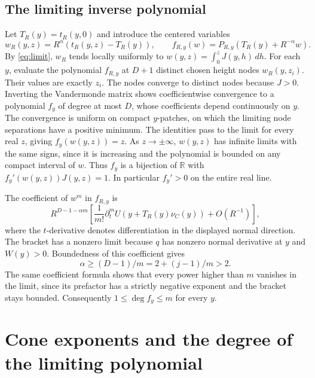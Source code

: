 \documentclass[11pt]{amsart}
\begin{document}
\subsection{The limiting inverse polynomial}

Let \(T_R(y)=t_R(y,0)\) and introduce the centered variables
\begin{equation}\label{eq:centered}
 w_R(y,z)=R^\alpha(t_R(y,z)-T_R(y)),\qquad
 f_{R,y}(w)=P_{R,y}(T_R(y)+R^{-\alpha}w).
\end{equation}
By \eqref{eq:limit}, \(w_R\) tends locally uniformly to
\(w(y,z)=\int_0^z J(y,h)\,dh\). For each \(y\), evaluate the
polynomial \(f_{R,y}\) at \(D+1\) distinct chosen height nodes
\(w_R(y,z_i)\). Their values are exactly \(z_i\). The nodes
converge to distinct nodes because \(J>0\). Inverting the
Vandermonde matrix shows coefficientwise convergence to a
polynomial \(f_y\) of degree at most \(D\), whose coefficients
depend continuously on \(y\). The convergence is uniform on compact \(y\)-patches, on which the
limiting node separations have a positive minimum. The identities pass to the limit
for every real \(z\), giving \(f_y(w(y,z))=z\).
As \(z\to\pm\infty\), \(w(y,z)\) has infinite limits with
the same signs, since it is increasing and the polynomial
is bounded on any compact interval of \(w\). Thus \(f_y\)
is a bijection of \(\mathbb R\) with
\(f_y'(w(y,z))J(y,z)=1\). In particular \(f_y'>0\) on
the entire real line.

The coefficient of \(w^m\) in \(f_{R,y}\) is
\[
 R^{D-1-\alpha m}\left[
 \frac{1}{m!}\partial_t^m U(y+T_R(y)\nu_C(y))+O(R^{-1})
 \right],
\]
where the \(t\)-derivative denotes differentiation in the displayed
normal direction. The bracket has a nonzero limit because
\(q\) has nonzero normal derivative at \(y\) and \(W(y)>0\).
Boundedness of this coefficient gives
\begin{equation}\label{eq:alpha-bound}
 \alpha\ge(D-1)/m=2+(j-1)/m>2.
\end{equation}
The same coefficient formula shows that every power higher
than \(m\) vanishes in the limit, since its prefactor has a
strictly negative exponent and the bracket stays bounded.
Consequently \(1\le\deg f_y\le m\) for every \(y\).

\section{Cone exponents and the degree of the limiting polynomial}\label{sec:degree}
\end{document}
